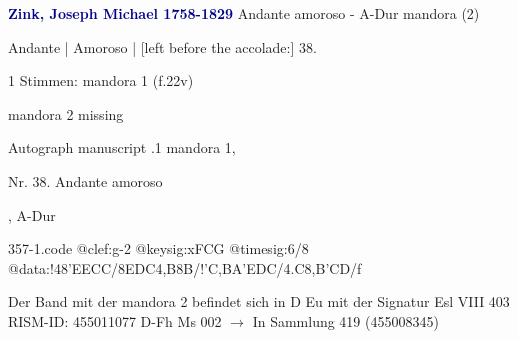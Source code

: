 \documentclass[twocolumn]{book}
\begin{document}
\newline \par \vspace{7pt} \textcolor{darkblue}{\textbf{Zink, Joseph Michael  1758-1829}}
\newline Andante amoroso - A-Dur
\newline mandora (2)
\newline \begin{itshape}[f.22v, at left:] Andante | Amoroso | [left before the accolade:] 38.\end{itshape} 
\newline \textcolor{darkblue}{}  1 Stimmen: mandora 1  (f.22v)
\newline \begin{small} mandora 2 missing\end{small} 
\newline Autograph manuscript
.1  mandora 1, \begin{itshape}Nr. 38. Andante amoroso\end{itshape}, A-Dur  
\begin{filecontents*}{357-1.code}
@clef:g-2
@keysig:xFCG
@timesig:6/8
@data:!48'EECC/8EDC4,B8B/!{'C,B}A'EDC/4.C8,B'CD/f
\end{filecontents*}
\newline
%
\newline Der Band mit der mandora 2 befindet sich in D Eu mit der Signatur Esl VIII 403
\newline RISM-ID: 455011077
\newline D-Fh  Ms 002
\newline $\rightarrow$ In Sammlung 419 (455008345)
      
\end{document}
